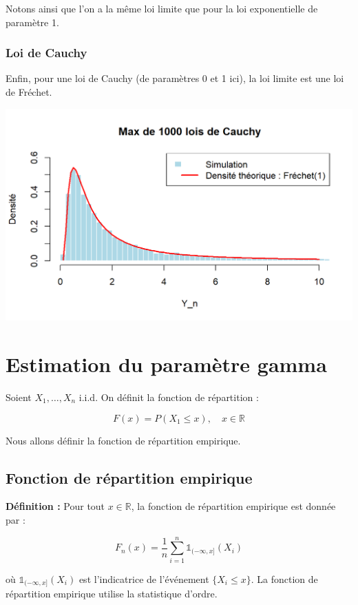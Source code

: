 \documentclass{article}
\begin{document}
\noindent Notons ainsi que l'on a la même loi limite que pour la loi exponentielle de paramètre 1.

\subsubsection{Loi de Cauchy}

\noindent Enfin, pour une loi de Cauchy (de paramètres 0 et 1 ici), la loi limite est une loi de Fréchet. 

\begin{center}
	\includegraphics[scale=0.8]{./Codes_R/Max_Cauchy.png} 
\end{center}


\newpage
\section{Estimation du paramètre gamma} 

Soient \(X_1, \dots, X_n\) i.i.d. On définit la fonction de répartition :

\[
F(x) = P(X_1 \leq x), \quad x \in \mathbb{R}
\]

Nous allons définir la fonction de répartition empirique.

\subsection{Fonction de répartition empirique}

\textbf{Définition :} Pour tout \(x \in \mathbb{R}\), la fonction de répartition empirique est donnée par :

\[
F_n(x) = \frac{1}{n} \sum_{i=1}^{n} \mathbb{1}_{(-\infty, x]}(X_i)
\]

où \(\mathbb{1}_{(-\infty, x]}(X_i)\) est l'indicatrice de l'événement \(\{X_i \leq x\}\).
La fonction de répartition empirique utilise la statistique d'ordre.
\end{document}
